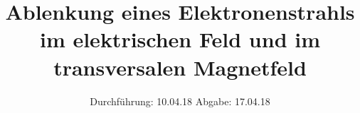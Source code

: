 

\subject{V501 und V502}
\title{Ablenkung eines Elektronenstrahls im elektrischen Feld und im transversalen Magnetfeld}
\date{%
  Durchführung: 10.04.18
  \hspace{3em}
  Abgabe: 17.04.18
}



\maketitle
\thispagestyle{empty}
\tableofcontents
\newpage






\printbibliography{}


